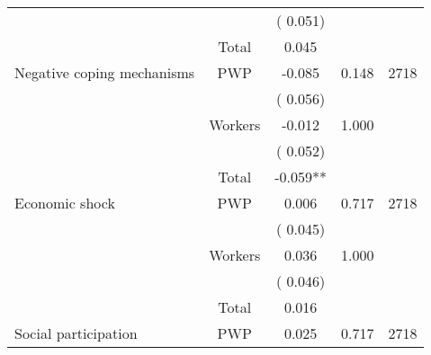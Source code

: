 \begin{tabular}{l*{4}{c}}
                               &                               &       (       0.051)                     & &                                                                             \\ 
\cmidrule{2-3}
                               &       Total           &              0.045                 &    &                                               \\ 
\cmidrule{2-3}
 Negative coping mechanisms                 &       PWP     &             -0.085               &       0.148    & 2718                              \\ 
                               &                               &       (       0.056)                     & &                                                                             \\ 
                               &       Workers         &             -0.012               &        1.000   &                                               \\ 
                               &                               &       (       0.052)                     & &                                                                             \\ 
\cmidrule{2-3}
                               &       Total           &             -0.059**                 &    &                                               \\ 
\cmidrule{2-3}
 Economic shock                 &       PWP     &              0.006               &        0.717   & 2718                              \\ 
                               &                               &       (       0.045)                     & &                                                                             \\ 
                               &       Workers         &              0.036               &        1.000   &                                               \\ 
                               &                               &       (       0.046)                     & &                                                                             \\ 
\cmidrule{2-3}
                               &       Total           &              0.016                 &    &                                               \\ 
\cmidrule{2-3}
 Social participation                 &       PWP     &              0.025               &        0.717   & 2718                              \\ 

\end{tabular}
